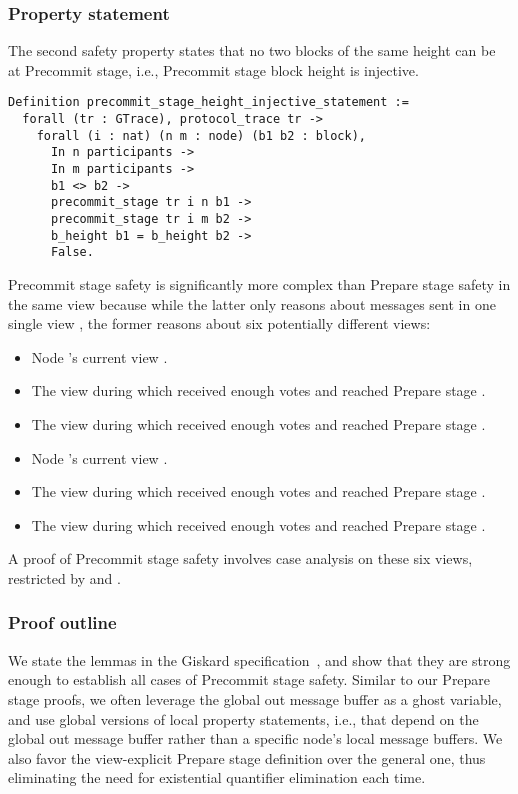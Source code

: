 \documentclass{easychair}
\begin{document}
\subsubsection{Property statement}
The second safety property states that no two blocks of the same height can be at Precommit stage, i.e., Precommit stage block height is injective. 
\begin{lstlisting}[language=Coq]
Definition precommit_stage_height_injective_statement :=
  forall (tr : GTrace), protocol_trace tr ->
    forall (i : nat) (n m : node) (b1 b2 : block),
      In n participants ->
      In m participants ->
      b1 <> b2 ->
      precommit_stage tr i n b1 ->
      precommit_stage tr i m b2 ->
      b_height b1 = b_height b2 ->
      False.
\end{lstlisting}

Precommit stage safety is significantly more complex than Prepare stage safety in the same view because while the latter only reasons about messages sent in one single view , the former reasons about six potentially different views: 
\begin{itemize}[leftmargin=*]
    \item Node 's current view .
    \item The view during which  received enough votes and reached Prepare stage . 
    \item The view during which  received enough votes and reached Prepare stage .
    \item Node 's current view .
    \item The view during which  received enough votes and reached Prepare stage . 
    \item The view during which  received enough votes and reached Prepare stage .  
\end{itemize}

A proof of Precommit stage safety involves case analysis on these six views, restricted by  and .  

\subsubsection{Proof outline}
We state the lemmas in the Giskard specification~\cite{GiskardSpec}, and show that they are strong enough to establish all cases of Precommit stage safety. Similar to our Prepare stage proofs, we often leverage the global out message buffer as a ghost variable, and use global versions of local property statements, i.e., that depend on the global out message buffer rather than a specific node's local message buffers. We also favor the view-explicit Prepare stage definition over the general one, thus eliminating the need for existential quantifier elimination each time. 
\end{document}
